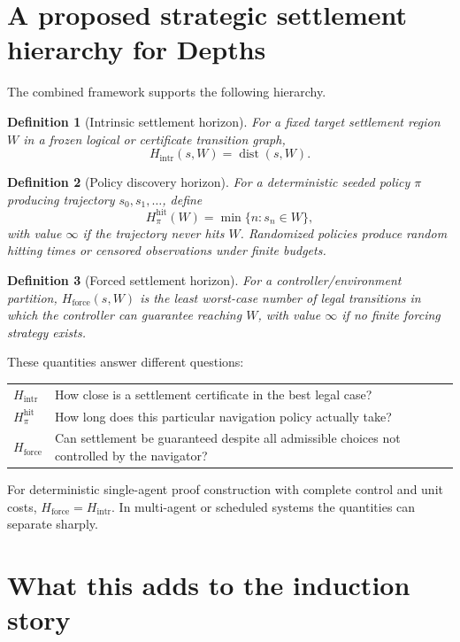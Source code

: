 \documentclass[11pt]{article}
\newtheorem{definition}{Definition}[section]
\theoremstyle{remark}
\newcommand{\dist}{\operatorname{dist}}
\begin{document}
\section{A proposed strategic settlement hierarchy for Depths}

The combined framework supports the following hierarchy.

\begin{definition}[Intrinsic settlement horizon]
For a fixed target settlement region $W$ in a frozen logical or certificate transition graph,
\[
H_{\mathrm{intr}}(s,W)=\dist(s,W).
\]
\end{definition}

\begin{definition}[Policy discovery horizon]
For a deterministic seeded policy $\pi$ producing trajectory $s_0,s_1,\ldots$, define
\[
H_{\pi}^{\mathrm{hit}}(W)
=
\min\{n:s_n\in W\},
\]
with value $\infty$ if the trajectory never hits $W$. Randomized policies produce random hitting times or censored observations under finite budgets.
\end{definition}

\begin{definition}[Forced settlement horizon]
For a controller/environment partition, $H_{\mathrm{force}}(s,W)$ is the least worst-case number of legal transitions in which the controller can guarantee reaching $W$, with value $\infty$ if no finite forcing strategy exists.
\end{definition}

These quantities answer different questions:
\begin{center}
\begin{tabular}{p{}p{}}
\toprule
$H_{\mathrm{intr}}$ & How close is a settlement certificate in the best legal case?\\
$H_{\pi}^{\mathrm{hit}}$ & How long does this particular navigation policy actually take?\\
$H_{\mathrm{force}}$ & Can settlement be guaranteed despite all admissible choices not controlled by the navigator?\\
\bottomrule
\end{tabular}
\end{center}

For deterministic single-agent proof construction with complete control and unit costs, $H_{\mathrm{force}}=H_{\mathrm{intr}}$. In multi-agent or scheduled systems the quantities can separate sharply.

\section{What this adds to the induction story}
\end{document}
